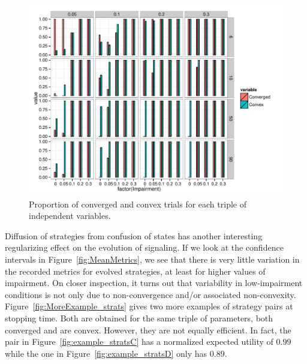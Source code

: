 \begin{figure}
  \centering
  
  \includegraphics[width=\textwidth]{plots/CategoricalMeasures.pdf}

  \caption{Proportion of converged and convex trials for each triple
    of independent variables.}
  \label{fig:CategoricalMeasures}
\end{figure}

Diffusion of strategies from confusion of states has another
interesting regularizing effect on the evolution of signaling. If we
look at the confidence intervals in Figure~\ref{fig:MeanMetrics}, we
see that there is very little variation in the recorded metrics for
evolved strategies, at least for higher values of impairment. On
closer inspection, it turns out that variability in low-impairment
conditions is not only due to non-convergence and/or associated
non-convexity. Figure~\ref{fig:MoreExample_strats} gives two more
examples of strategy pairs at stopping time. Both are obtained for the
same triple of parameters, both converged and are convex. However,
they are not equally efficient. In fact, the pair in
Figure~\ref{fig:example_stratsC} has a normalized expected utility of
$0.99$ while the one in Figure~\ref{fig:example_stratsD} only has
$0.89$.


